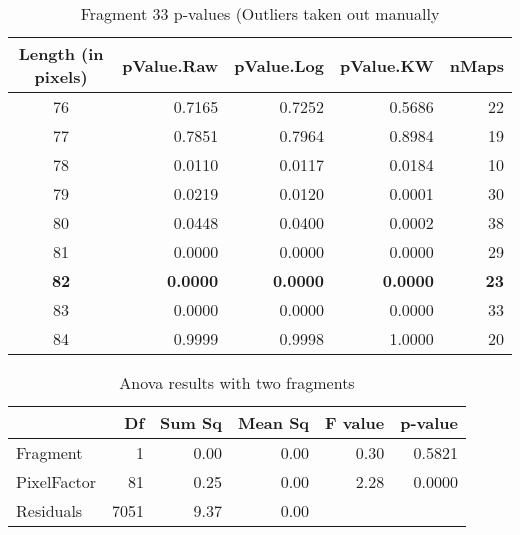 \documentclass[14pt]{article}
\begin{document}
\begin{table}[ht]
\centering
\begin{tabular}{crrrr}
  \hline
Length (in pixels) & pValue.Raw & pValue.Log & pValue.KW & nMaps \\ 
  \hline
76 & 0.7165 & 0.7252 & 0.5686 & 22 \\ 
  77 & 0.7851 & 0.7964 & 0.8984 & 19 \\ 
  78 & 0.0110 & 0.0117 & 0.0184 & 10 \\ 
  79 & 0.0219 & 0.0120 & 0.0001 & 30 \\ 
  80 & 0.0448 & 0.0400 & 0.0002 & 38 \\ 
  81 & 0.0000 & 0.0000 & 0.0000 & 29 \\
  {\textbf{82}} & {\textbf{0.0000}} & {\textbf{0.0000}} & {\textbf{0.0000}} & {\textbf{23}} \\ 
  83 & 0.0000 & 0.0000 & 0.0000 & 33 \\ 
  84 & 0.9999 & 0.9998 & 1.0000 & 20 \\ 
   \hline
\end{tabular}
\caption{Fragment 33 p-values (Outliers taken out manually} 
\end{table}

\begin{table}[ht]
\centering
\begin{tabular}{lrrrrr}
  \hline
 & Df & Sum Sq & Mean Sq & F value & p-value \\ 
  \hline
Fragment & 1 & 0.00 & 0.00 & 0.30 & 0.5821 \\ 
  PixelFactor & 81 & 0.25 & 0.00 & 2.28 & 0.0000 \\ 
  Residuals & 7051 & 9.37 & 0.00 &  &  \\ 
   \hline
\end{tabular}
\caption{Anova results with two fragments}
\end{table}
\end{document}
